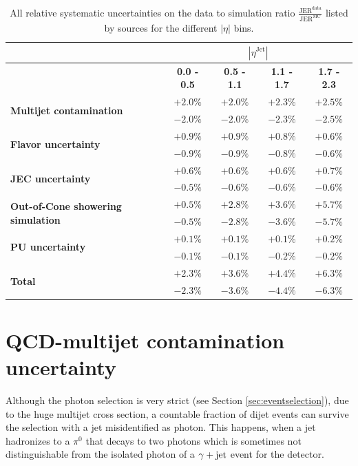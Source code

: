 \begin{table}[t]
\caption{All relative systematic uncertainties on the data to simulation ratio $\frac{\text{JER}^{\text{data}}}{\text{JER}^{\text{MC}}}$ listed by sources for the different $|\eta|$ bins.}
\renewcommand{\arraystretch}{1.2}
\begin{center}
\begin{tabular}{ l| c | c | c | c |}
\multicolumn{1}{c}{} & \multicolumn{4}{c}{$|\eta^{\text{Jet}}|$}\\\hline
& \textbf{0.0 - 0.5}& \textbf{0.5 - 1.1}& \textbf{1.1 - 1.7}& \textbf{1.7 - 2.3}\\\hline
\multirow{2}{*}{\textbf{Multijet contamination}}& $+2.0 \% $ & $+2.0 \% $ & $+2.3 \% $ & $+2.5 \% $ \\
& $-2.0 \% $ & $-2.0 \% $ & $-2.3 \% $ & $-2.5 \% $ \\\hline
\multirow{2}{*}{\textbf{Flavor uncertainty}}& $+0.9 \% $ & $+0.9 \% $ & $+0.8 \% $ & $+0.6 \% $ \\
& $-0.9 \% $ & $-0.9 \% $ & $-0.8 \% $ & $-0.6 \% $ \\\hline
\multirow{2}{*}{\textbf{JEC uncertainty}}& $+0.6 \% $ & $+0.6 \% $ & $+0.6 \% $ & $+0.7 \% $ \\
& $-0.5 \% $ & $-0.6 \% $ & $-0.6 \% $ & $-0.6 \% $ \\\hline
\multirow{2}{*}{\textbf{Out-of-Cone showering simulation}}& $+0.5 \% $ & $+2.8 \% $ & $+3.6 \% $ & $+5.7 \% $ \\
& $-0.5 \% $ & $-2.8 \% $ & $-3.6 \% $ & $-5.7 \% $ \\\hline
\multirow{2}{*}{\textbf{PU uncertainty}}& $+0.1 \% $ & $+0.1 \% $ & $+0.1 \% $ & $+0.2 \% $ \\
& $-0.1 \% $ & $-0.1 \% $ & $-0.2 \% $ & $-0.2 \% $ \\\hline\hline
\multirow{2}{*}{\textbf{Total}}& $+2.3 \% $ & $+3.6 \% $ & $+4.4 \% $ & $+6.3 \% $ \\
& $-2.3 \% $ & $-3.6 \% $ & $-4.4 \% $ & $-6.3 \% $ \\\hline
\end{tabular}
\end{center}
\label{tab:Uncertainties}
\end{table}

\section*{QCD-multijet contamination uncertainty}
Although the photon selection is very strict (see Section \ref{sec:eventselection}), 
due to the huge multijet cross section, a countable fraction of dijet events can survive the selection with a jet misidentified as photon.
This happens, when \eg a jet hadronizes to a $\pi^0$ that decays to two photons which is sometimes not distinguishable from the isolated photon of a $\gamma + \text{jet}$ event for the detector.

